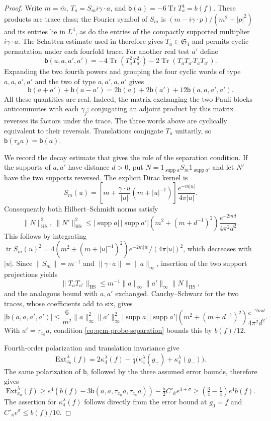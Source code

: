 \documentclass[11pt,letterpaper,reqno]{amsart}
\theoremstyle{definition}
\begin{document}
\begin{proof}
Write $m=\bar m$, $T_a=S_m i\gamma\cdot a$, and
$\mathsf b(a)=-6\operatorname{Tr}T_a^4=b(f)$.
These products are trace class; the Fourier symbol of $S_m$ is
$(m-i\gamma\cdot p)/(m^2+|p|^2)$ and its entries lie in $L^4$,
as do the entries of the compactly supported multiplier
$i\gamma\cdot a$. The Schatten estimate used in
\cite[Section~17, equation~(17.4)]{QEDConstruction} therefore gives
$T_a\in\mathfrak S_4$ and permits cyclic permutation under each
fourfold trace.
For another real test $a'$ define
\[
 \mathsf b(a,a,a',a')
 =-4\operatorname{Tr}(T_a^2T_{a'}^2)
  -2\operatorname{Tr}(T_aT_{a'}T_aT_{a'}).
\]
Expanding the two fourth powers and grouping the four cyclic words
of type $a,a,a',a'$ and the two of type $a,a',a,a'$ gives
\[
 \mathsf b(a+a')+\mathsf b(a-a')
 =2\mathsf b(a)+2\mathsf b(a')+12\mathsf b(a,a,a',a').
\]
All these quantities are real. Indeed, the matrix exchanging the
two Pauli blocks anticommutes with each $\gamma_j$; conjugating an
adjoint product by this matrix reverses its factors under the trace.
The three words above are cyclically equivalent to their reversals.
Translations conjugate $T_a$ unitarily, so
$\mathsf b(\tau_xa)=\mathsf b(a)$.

We record the decay estimate that gives the role of the separation
condition. If the supports of $a,a'$ have distance $d>0$, put
$N=1_{\operatorname{supp}a}S_m1_{\operatorname{supp}a'}$ and let
$N'$ have the two supports reversed. The explicit Dirac kernel is
\[
 S_m(u)=\left[m+\frac{\gamma\cdot u}{|u|}
                    (m+|u|^{-1})\right]
                   \frac{e^{-m|u|}}{4\pi|u|}.
\]
Consequently both Hilbert--Schmidt norms satisfy
\[
 \|N\|_{\mathrm{HS}}^2,\ \|N'\|_{\mathrm{HS}}^2
 \le |\operatorname{supp}a|\,|\operatorname{supp}a'|
       \left(m^2+(m+d^{-1})^2\right)
       \frac{e^{-2md}}{4\pi^2d^2}.
\]
This follows by integrating
$\operatorname{tr}S_m(u)^2
 =4(m^2+(m+|u|^{-1})^2)e^{-2m|u|}/(4\pi|u|)^2$,
which decreases with $|u|$.
Since $\|S_m\|=m^{-1}$ and
$\|\gamma\cdot a\|=\|a\|_\infty$, insertion of the two support
projections yields
\[
 \|T_aT_{a'}\|_{\mathrm{HS}}
 \le m^{-1}\|a\|_\infty\|a'\|_\infty\|N\|_{\mathrm{HS}},
\]
and the analogous bound with $a,a'$ exchanged. Cauchy--Schwarz
for the two traces, whose coefficients add to six, gives
\[
 |\mathsf b(a,a,a',a')|
 \le\frac6{m^2}\|a\|_\infty^2\|a'\|_\infty^2
 |\operatorname{supp}a|\,|\operatorname{supp}a'|
 \left(m^2+(m+d^{-1})^2\right)\frac{e^{-2md}}{4\pi^2d^2}.
\]
With $a'=\tau_{x_0}a$, condition
\eqref{eq:qcm-probe-separation} bounds this by $b(f)/12$.

Fourth-order polarization and translation invariance give
\[
 \mathrm{Ext}_{x_0}^\lambda(f)
 =2\kappa_4^\lambda(f)
   -\tfrac14\bigl(\kappa_4^\lambda(g_+)
                         +\kappa_4^\lambda(g_-)\bigr).
\]
The same polarization of $\mathsf b$, followed by the three assumed
error bounds, therefore gives
\[
 \mathrm{Ext}_{x_0}^\lambda(f)
 \ge e^4\left(b(f)-3\mathsf b(a,a,\tau_{x_0}a,\tau_{x_0}a)\right)
      -\tfrac52 C'_{\bar\kappa}e^{4+\sigma}
 \ge\left(\tfrac34-\tfrac14\right)e^4b(f).
\]
The assertion for $\kappa_4^\lambda(f)$ follows directly from the
error bound at $g_0=f$ and $C'_{\bar\kappa}e^\sigma\le b(f)/10$.
\end{proof}
\end{document}
